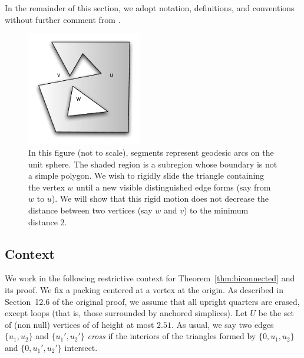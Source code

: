 \documentclass[11pt]{amsart}
\begin{document}
In the remainder of this section, 
we adopt notation, definitions, and conventions without further comment
from \cite{Hales:2006:DCG:4}.  

\begin{figure}
\begin{center}
\includegraphics[width=5cm]{biconnected.pdf}
\end{center}
\caption{In this figure (not to scale), segments represent geodesic arcs on the unit sphere.  The shaded region is a subregion whose boundary is not a simple polygon.
We wish to rigidly slide the triangle containing the vertex $w$ until a new visible distinguished edge forms
(say from $w$ to $u$).  We will show that this rigid motion does not decrease the distance between
two vertices (say $w$ and $v$)  to the minimum distance $2$.}
\label{fig:biconnected}
\end{figure}


\subsection{Context}

We work in the following restrictive
context for Theorem~\ref{thm:biconnected} and its proof.  
We fix a packing centered at a vertex at the origin.
As described in Section~12.6 of the original proof, we assume that all upright quarters
are erased, except loops (that is, those surrounded by anchored simplices).    
Let $U$ be the set of (non null) vertices of of height at most $2.51$.  As usual, we say two edges $\{u_1,u_2\}$ and $\{u_1',u_2'\}$ {\it cross}
if the interiors of the triangles formed by $\{0,u_1,u_2\}$ and $\{0,u_1',u_2'\}$ intersect.
\end{document}
